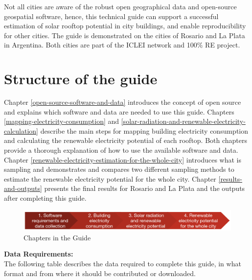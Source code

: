 \documentclass[
]{book}
\begin{document}
Not all cities are aware of the robust open geographical data and open-source geospatial software, hence, this technical guide can support a successful estimation of solar rooftop potential in city buildings, and enable reproducibility for other cities.
The guide is demonstrated on the cities of Rosario and La Plata in Argentina. Both cities are part of the ICLEI network and 100\% RE project.

\hypertarget{structure-of-the-guide}{%
\section*{Structure of the guide}\label{structure-of-the-guide}}

Chapter \ref{open-source-software-and-data} introduces the concept of open source and explains which software and data are needed to use this guide. Chapters \ref{mapping-electricity-consumption} and \ref{solar-radiation-and-renewable-electricity-calculation} describe the main steps for mapping building electricity consumption and calculating the renewable electricity potential of each rooftop. Both chapters provide a thorough explanation of how to use the available software and data. Chapter \ref{renewable-electricity-estimation-for-the-whole-city} introduces what is sampling and demonstrates and compares two different sampling methods to estimate the renewable electricity potential for the whole city. Chapter \ref{results-and-outputs} presents the final results for Rosario and La Plata and the outputs after completing this guide.

\begin{figure}

{\centering \includegraphics[width=1\linewidth]{images/structure} 

}

\caption{Chapters in the Guide}\label{fig:img2232}
\end{figure}

\textbf{Data Requirements:}\\
The following table describes the data required to complete this guide, in what format and from where it should be contributed or downloaded.
\end{document}
